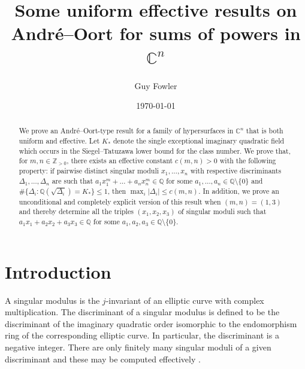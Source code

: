 \documentclass[11pt,a4paper, british]{amsart}
\theoremstyle{definition}
\theoremstyle{remark}
\numberwithin{equation}{section}
\newcommand{\Q}{\mathbb{Q}} %
\newcommand{\Z}{\mathbb{Z}} %
\newcommand{\C}{\mathbb{C}} %
\begin{document}
	
		\title[Andr\'e--Oort for sums of powers in $\C^n$]{Some uniform effective results on Andr\'e--Oort for sums of powers in $\C^n$}
	\author{Guy Fowler}
	\address{Department of Mathematics, University of Manchester, Manchester, UK
	\newline
	\indent
	Heilbronn Institute for Mathematical Research, Bristol, UK}
	\date{\today}
	

	\begin{abstract}
	We prove an Andr\'e--Oort-type result for a family of hypersurfaces in $\C^n$ that is both uniform and effective. Let $K_*$ denote the single exceptional imaginary quadratic field which occurs in the Siegel--Tatuzawa lower bound for the class number. We prove that, for $m, n \in \Z_{>0}$, there exists an effective constant $c(m, n)>0$ with the following property: if pairwise distinct singular moduli $x_1, \ldots, x_n$ with respective discriminants $\Delta_1, \ldots, \Delta_n$ are such that $a_1 x_1^m + \ldots + a_n x_n^m \in \Q$ for some $a_1, \ldots, a_n \in \Q \setminus \{0\}$ and $\# \{ \Delta_i : \Q(\sqrt{\Delta_i}) = K_*\}  \leq 1$, then $\max_i \lvert \Delta_i \rvert \leq c(m, n)$. In addition, we prove an unconditional and completely explicit version of this result when $(m, n) = (1, 3)$  and thereby determine all the triples $(x_1, x_2, x_3)$ of singular moduli such that $a_1 x_1 + a_2 x_2 + a_3 x_3 \in \Q$ for some $a_1, a_2, a_3 \in \Q \setminus \{0\}$.
\end{abstract}
	
	\maketitle
	
	
	\section{Introduction}\label{sec:intro}
	
	A singular modulus is the $j$-invariant of an elliptic curve with complex multiplication. The discriminant of a singular modulus is defined to be the discriminant of the imaginary quadratic order isomorphic to the endomorphism ring of the corresponding elliptic curve. In particular, the discriminant is a negative integer. There are only finitely many singular moduli of a given discriminant and these may be computed effectively \cite[\S13]{Cox22}.
	
\end{document}
